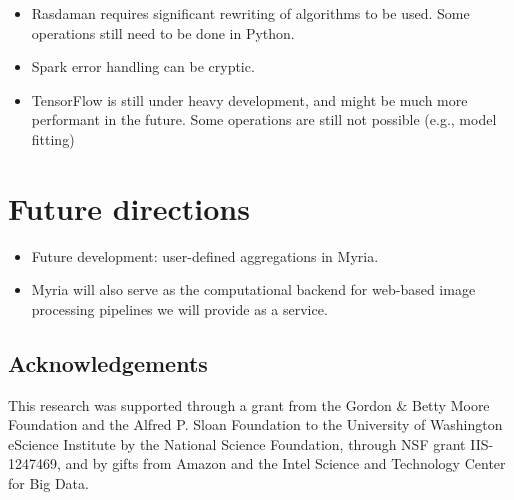 \documentclass[a0,landscape]{a0poster}
\begin{document}
\begin{multicols}{3}
\begin{itemize}
\item Rasdaman requires significant rewriting of algorithms to be used. Some operations still need to be done in Python.

\item  Spark error handling can be cryptic.

\item TensorFlow is still under heavy development, and might be much more performant in the future. Some operations are still not possible (e.g., model fitting)

\end{itemize}

\color{DarkSlateGray} %


\section*{Future directions}
\begin{itemize}

\item Future development: user-defined aggregations in Myria.

\item Myria will also serve as the computational backend for web-based image processing pipelines we will provide as a service.

\end{itemize}

\nocite{*} %
\footnotesize  %

\subsection*{Acknowledgements}
\footnotesize
This research was supported through a grant from the Gordon \& Betty Moore
Foundation and the Alfred P. Sloan Foundation to the University of Washington
eScience Institute by the National Science Foundation, through NSF grant
IIS-1247469, and by gifts from Amazon and the Intel Science and Technology
Center for Big Data.


\end{multicols}
\end{document}
